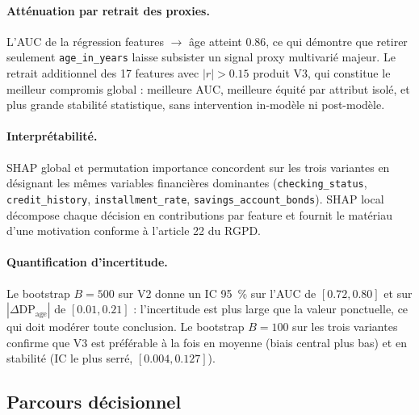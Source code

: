\documentclass[11pt, a4paper]{article}
\begin{document}
\paragraph{Atténuation par retrait des proxies.} L'AUC de la régression features $\to$ âge atteint 0.86, ce qui démontre que retirer seulement \texttt{age\_in\_years} laisse subsister un signal proxy multivarié majeur. Le retrait additionnel des 17 features avec $|r| > 0.15$ produit V3, qui constitue le meilleur compromis global : meilleure AUC, meilleure équité par attribut isolé, et plus grande stabilité statistique, sans intervention in-modèle ni post-modèle.

\paragraph{Interprétabilité.} SHAP global et permutation importance concordent sur les trois variantes en désignant les mêmes variables financières dominantes (\texttt{checking\_status}, \texttt{credit\_history}, \texttt{installment\_rate}, \texttt{savings\_account\_bonds}). SHAP local décompose chaque décision en contributions par feature et fournit le matériau d'une motivation conforme à l'article 22 du RGPD.

\paragraph{Quantification d'incertitude.} Le bootstrap $B = 500$ sur V2 donne un IC 95~\% sur l'AUC de $[0.72, 0.80]$ et sur $|\Delta\text{DP}_{\text{age}}|$ de $[0.01, 0.21]$ : l'incertitude est plus large que la valeur ponctuelle, ce qui doit modérer toute conclusion. Le bootstrap $B = 100$ sur les trois variantes confirme que V3 est préférable à la fois en moyenne (biais central plus bas) et en stabilité (IC le plus serré, $[0.004, 0.127]$).

\subsection{Parcours décisionnel}
\end{document}
